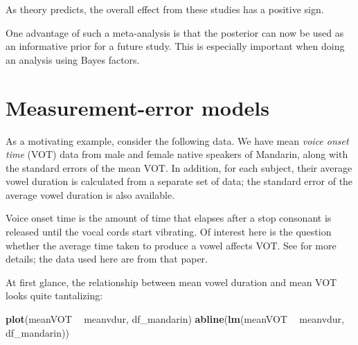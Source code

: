 \documentclass[12pt,]{krantz}
\newenvironment{Shaded}{\begin{snugshade}}{\end{snugshade}}
\newcommand{\KeywordTok}[1]{\textcolor[rgb]{0.13,0.29,0.53}{\textbf{#1}}}
\newcommand{\DataTypeTok}[1]{\textcolor[rgb]{0.13,0.29,0.53}{#1}}
\newcommand{\StringTok}[1]{\textcolor[rgb]{0.31,0.60,0.02}{#1}}
\newcommand{\CommentTok}[1]{\textcolor[rgb]{0.56,0.35,0.01}{\textit{#1}}}
\newcommand{\OtherTok}[1]{\textcolor[rgb]{0.56,0.35,0.01}{#1}}
\newcommand{\OperatorTok}[1]{\textcolor[rgb]{0.81,0.36,0.00}{\textbf{#1}}}
\newcommand{\NormalTok}[1]{#1}
\theoremstyle{definition}
\theoremstyle{definition}
\theoremstyle{definition}
\theoremstyle{remark}
\begin{document}
As theory predicts, the overall effect from these studies has a positive
sign.

One advantage of such a meta-analysis is that the posterior can now be
used as an informative prior for a future study. This is especially
important when doing an analysis using Bayes factors.

\section{Measurement-error models}\label{measurement-error-models}

As a motivating example, consider the following data. We have mean
\emph{voice onset time} (VOT) data from male and female native speakers
of Mandarin, along with the standard errors of the mean VOT. In
addition, for each subject, their average vowel duration is calculated
from a separate set of data; the standard error of the average vowel
duration is also available.

Voice onset time is the amount of time that elapses after a stop
consonant is released until the vocal cords start vibrating. Of interest
here is the question whether the average time taken to produce a vowel
affects VOT. See \citet{VasishthBeckmanetal} for more details; the data
used here are from that paper.

\begin{Shaded}
\end{Shaded}

At first glance, the relationship between mean vowel duration and mean
VOT looks quite tantalizing:

\begin{Shaded}
\begin{Highlighting}[]
\KeywordTok{plot}\NormalTok{(meanVOT }\OperatorTok{~}\StringTok{ }\NormalTok{meanvdur, df_mandarin)}
\KeywordTok{abline}\NormalTok{(}\KeywordTok{lm}\NormalTok{(meanVOT }\OperatorTok{~}\StringTok{ }\NormalTok{meanvdur, df_mandarin))}
\end{Highlighting}
\end{Shaded}
\end{document}
